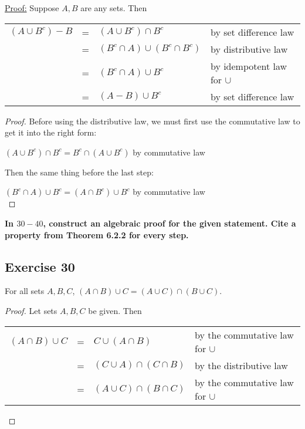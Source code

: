 \documentclass[14pt]{extarticle}
\newcommand{\cy}{\color{cyan}}
\begin{document}
\underline{Proof:} Suppose $A,B$ are any sets. Then
\begin{center}
  \begin{tabular}{rcll}
    \((A \cup B^c) - B\) & = & \((A \cup B^c) \cap B^c\)            & {\cy by set difference law}        \\
                         & = & \((B^c \cap A) \cup (B^c \cap B^c)\) & {\cy by distributive law}          \\
                         & = & \((B^c \cap A) \cup B^c\)            & {\cy by idempotent law for $\cup$} \\
                         & = & \((A-B) \cup B^c\)                   & {\cy by set difference law}
  \end{tabular}
\end{center}
\begin{proof}
  Before using the distributive law, we must first use the commutative law to get it into the right form:

  \((A \cup B^c) \cap B^c = B^c \cap (A \cup B^c)\) {\cy by commutative law}

  Then the same thing before the last step:

  \((B^c \cap A) \cup B^c = (A \cap B^c) \cup B^c\) {\cy by commutative law} \\
\end{proof}

{\bf \cy In $30-40$, construct an algebraic proof for the given statement. Cite a property from Theorem 6.2.2 for every step.}

\subsection{Exercise 30}
For all sets $A, B, C$, \((A \cap B) \cup C = (A \cup C) \cap (B \cup C)\).

\begin{proof}
  Let sets $A,B,C$ be given. Then
  \begin{center}
    \begin{tabular}{rcll}
      \((A \cap B) \cup C\) & = & \(C \cup (A \cap B)\)          & {\cy by the commutative law for $\cup$} \\
                            & = & \((C \cup A) \cap (C \cap B)\) & {\cy by the distributive law}           \\
                            & = & \((A \cup C) \cap (B \cap C)\) & {\cy by the commutative law for $\cup$}
    \end{tabular}
  \end{center}
\end{proof}
\end{document}
